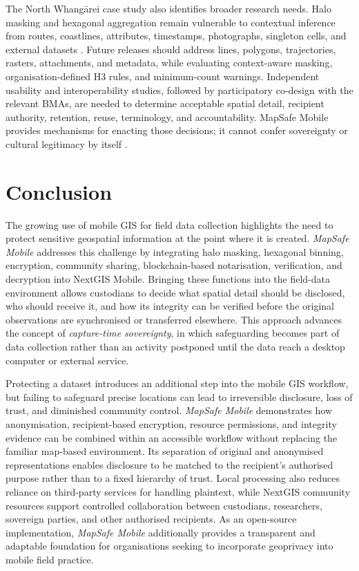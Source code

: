 \documentclass[]{interact}
\begin{document}
The North Whangārei case study also identifies broader research needs. Halo masking and hexagonal aggregation remain vulnerable to contextual inference from routes, coastlines, attributes, timestamps, photographs, singleton cells, and external datasets \citep{kessler2018geoprivacy,cassa2008re,zimmerman2008quantifying}. Future releases should address lines, polygons, trajectories, rasters, attachments, and metadata, while evaluating context-aware masking, organisation-defined H3 rules, and minimum-count warnings. Independent usability and interoperability studies, followed by participatory co-design with the relevant BMAs, are needed to determine acceptable spatial detail, recipient authority, retention, reuse, terminology, and accountability. MapSafe Mobile provides mechanisms for enacting those decisions; it cannot confer sovereignty or cultural legitimacy by itself \citep{kukutai2016indigenous,lovett2019gooddata,carroll2020care,jennings2023care,reyesgarcia2022}.

\section{Conclusion}
\label{sec:conclusion}

The growing use of mobile GIS for field data collection highlights the need to protect sensitive geospatial information at the point where it is created. \textit{MapSafe Mobile} addresses this challenge by integrating halo masking, hexagonal binning, encryption, community sharing, blockchain-based notarisation, verification, and decryption into NextGIS Mobile. Bringing these functions into the field-data environment allows custodians to decide what spatial detail should be disclosed, who should receive it, and how its integrity can be verified before the original observations are synchronised or transferred elsewhere. This approach advances the concept of \emph{capture-time sovereignty}, in which safeguarding becomes part of data collection rather than an activity postponed until the data reach a desktop computer or external service.

Protecting a dataset introduces an additional step into the mobile GIS workflow, but failing to safeguard precise locations can lead to irreversible disclosure, loss of trust, and diminished community control. \textit{MapSafe Mobile} demonstrates how anonymisation, recipient-based encryption, resource permissions, and integrity evidence can be combined within an accessible workflow without replacing the familiar map-based environment. Its separation of original and anonymised representations enables disclosure to be matched to the recipient's authorised purpose rather than to a fixed hierarchy of trust. Local processing also reduces reliance on third-party services for handling plaintext, while NextGIS community resources support controlled collaboration between custodians, researchers, sovereign parties, and other authorised recipients. As an open-source implementation, \textit{MapSafe Mobile} additionally provides a transparent and adaptable foundation for organisations seeking to incorporate geoprivacy into mobile field practice.
\end{document}

